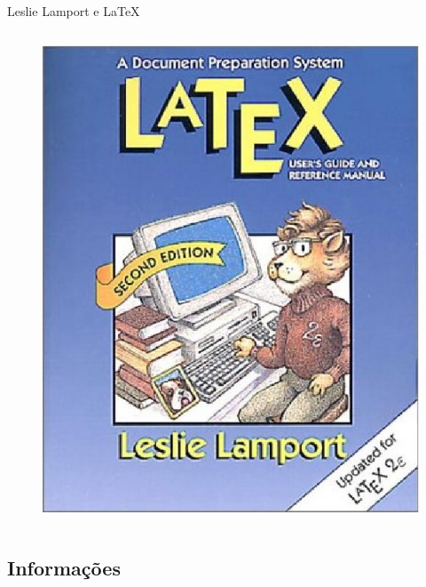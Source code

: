 \documentclass[hyperref={pdfpagelabels=false}]{beamer}
\begin{document}
\begin{frame}{Leslie Lamport e \LaTeX{}}
\begin{columns}[c]
\begin{column}{0.5\textwidth}
\begin{figure}
                \includegraphics[width=\textwidth]{images/latexbook}
            \end{figure}
        \end{column}
    \end{columns}
\end{frame}

\subsection{Informações}
\end{document}
